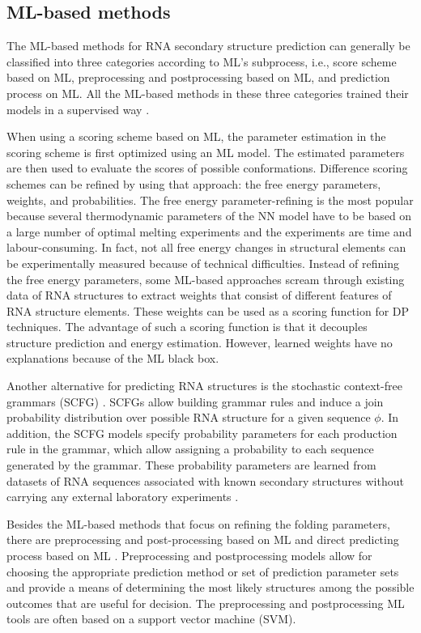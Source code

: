 \subsection{ML-based methods}
The ML-based methods for RNA secondary structure prediction can generally be classified into three categories according to ML's subprocess, i.e., score scheme based on ML, preprocessing and postprocessing based on ML, and prediction process on ML. All the ML-based methods in these three categories trained their models in a supervised way \cite{zhao2021review}. 

When using a scoring scheme based on ML,  the parameter estimation in the scoring scheme is first optimized using an ML model. The estimated parameters are then used to evaluate the scores of possible conformations. Difference scoring schemes can be refined by using that approach: the free energy parameters, weights, and probabilities. The free energy parameter-refining is the most popular because several thermodynamic parameters of the NN model have to be based on a large number of optimal melting experiments and the experiments are time and labour-consuming. In fact, not all free energy changes in structural elements can be experimentally measured because of technical difficulties. Instead of refining the free energy parameters, some ML-based approaches scream through existing data of RNA structures to extract weights that consist of different features of RNA structure elements. These weights can be used as a scoring function for DP techniques. The advantage of such a scoring function is that it decouples structure prediction and energy estimation. However, learned weights have no explanations because of the ML black box. 

Another alternative for predicting RNA structures is the stochastic context-free grammars (SCFG) \cite{sakakibara1994stochastic, rivas2012range, dowell2004evaluation, knudsen1999rna, knudsen2003pfold, woodson2000recent}. SCFGs allow building grammar rules and induce a join probability distribution over possible RNA structure for a given sequence $\phi$. In addition, the SCFG models specify probability parameters for each production rule in the grammar, which allow assigning a probability to each sequence generated by the grammar. These probability parameters are learned from datasets of RNA sequences associated with known secondary structures without carrying any external laboratory experiments \cite{dowell2004evaluation}. 

Besides the ML-based methods that focus on refining the folding parameters, there are preprocessing and post-processing based on ML \cite{hor2013tool, zhu2018research,haynes2008using} and direct predicting process based on ML \cite{takefuji1990parallel,liu2006hopfield,steeg1993neural}. Preprocessing and postprocessing models allow for choosing the appropriate prediction method or set of prediction parameter sets and provide a means of determining the most likely structures among the possible outcomes that are useful for decision. The preprocessing and postprocessing ML tools are often based on a support vector machine (SVM). 


